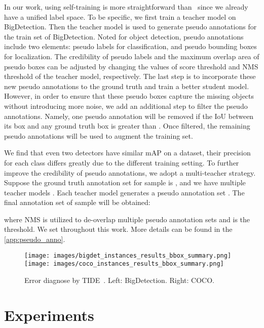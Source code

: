 \documentclass[10pt,twocolumn,letterpaper]{article}
\begin{document}
In our work, using self-training is more straightforward than~\cite{zhao2020object} since we already have a unified label space.
To be specific, we first train a teacher model on BigDetection.
Then the teacher model is used to generate pseudo annotations for the train set of BigDetection.
Noted for object detection, pseudo annotations include two elements: pseudo labels for classification, and pseudo bounding boxes for localization.
The credibility of pseudo labels and the maximum overlap area of pseudo boxes can be adjusted by changing the values of score threshold and NMS threshold of the teacher model, respectively.
The last step is to incorporate these new pseudo annotations to the ground truth and train a better student model.
However, in order to ensure that these pseudo boxes capture the missing objects without introducing more noise, we add an additional step to filter the pseudo annotations.
Namely, one pseudo annotation will be removed if the IoU between its box and any ground truth box is greater than . 
Once filtered, the remaining pseudo annotations will be used to augment the training set. 

We find that even two detectors have similar mAP on a dataset, their precision for each class differs greatly due to the different training setting. 
To further improve the credibility of pseudo annotations, we adopt a multi-teacher strategy. 
Suppose the ground truth annotation set for sample  is , and we have multiple teacher models . Each teacher model generates a pseudo annotation set . 
The final annotation set of sample  will be obtained:

where NMS is utilized to de-overlap multiple pseudo annotation sets and  is the threshold. We set  throughout this work. More details can be found in the \ref{app:pseudo_anno}.
\begin{figure}[t]
  \centering
  \texttt{[image: images/bigdet\_instances\_results\_bbox\_summary.png]}
  \texttt{[image: images/coco\_instances\_results\_bbox\_summary.png]}
  \caption{Error diagnose by TIDE~\cite{tide-eccv2020}. Left: BigDetection. Right: COCO.}
  \label{fig:error_ana}
  \vspace{-3ex}
\end{figure} 

 
\section{Experiments}
\label{sec:experiments}
\end{document}
